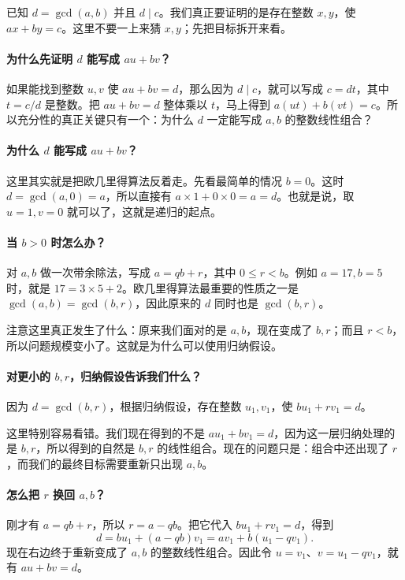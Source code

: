 \begin{pitfall}[思考：这份证明为什么要这样走？]
已知 $d=\gcd(a,b)$ 并且 $d\mid c$。我们真正要证明的是存在整数 $x,y$，使 $ax+by=c$。这里不要一上来猜 $x,y$；先把目标拆开来看。

\paragraph{为什么先证明 $d$ 能写成 $au+bv$？}
如果能找到整数 $u,v$ 使 $au+bv=d$，那么因为 $d\mid c$，就可以写成 $c=dt$，其中 $t=c/d$ 是整数。把 $au+bv=d$ 整体乘以 $t$，马上得到 $a(ut)+b(vt)=c$。所以充分性的真正关键只有一个：为什么 $d$ 一定能写成 $a,b$ 的整数线性组合？

\paragraph{为什么 $d$ 能写成 $au+bv$？}
这里其实就是把欧几里得算法反着走。先看最简单的情况 $b=0$。这时 $d=\gcd(a,0)=a$，所以直接有 $a\times1+0\times0=a=d$。也就是说，取 $u=1,v=0$ 就可以了，这就是递归的起点。

\paragraph{当 $b>0$ 时怎么办？}
对 $a,b$ 做一次带余除法，写成 $a=qb+r$，其中 $0\le r<b$。例如 $a=17,b=5$ 时，就是 $17=3\times5+2$。欧几里得算法最重要的性质之一是 $\gcd(a,b)=\gcd(b,r)$，因此原来的 $d$ 同时也是 $\gcd(b,r)$。

注意这里真正发生了什么：原来我们面对的是 $a,b$，现在变成了 $b,r$；而且 $r<b$，所以问题规模变小了。这就是为什么可以使用归纳假设。

\paragraph{对更小的 $b,r$，归纳假设告诉我们什么？}
因为 $d=\gcd(b,r)$，根据归纳假设，存在整数 $u_1,v_1$，使 $bu_1+rv_1=d$。

这里特别容易看错。我们现在得到的不是 $au_1+bv_1=d$，因为这一层归纳处理的是 $b,r$，所以得到的自然是 $b,r$ 的线性组合。现在的问题只是：组合中还出现了 $r$，而我们的最终目标需要重新只出现 $a,b$。

\paragraph{怎么把 $r$ 换回 $a,b$？}
刚才有 $a=qb+r$，所以 $r=a-qb$。把它代入 $bu_1+rv_1=d$，得到
\[
 d=bu_1+(a-qb)v_1=av_1+b(u_1-qv_1).
\]
现在右边终于重新变成了 $a,b$ 的整数线性组合。因此令 $u=v_1$、$v=u_1-qv_1$，就有 $au+bv=d$。


\end{pitfall}
